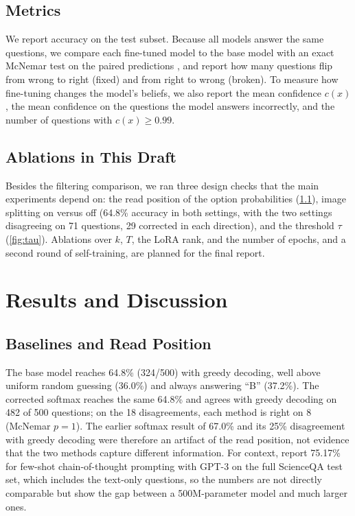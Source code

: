 \documentclass{article}
\begin{document}
\subsection{Metrics}
We report accuracy on the test subset. Because all models answer the same questions, we compare each fine-tuned model to the base model with an exact McNemar test on the paired predictions \citep{dietterich1998tests}, and report how many questions flip from wrong to right (fixed) and from right to wrong (broken). To measure how fine-tuning changes the model's beliefs, we also report the mean confidence $c(x)$, the mean confidence on the questions the model answers incorrectly, and the number of questions with $c(x) \geq 0.99$.

\subsection{Ablations in This Draft}
Besides the filtering comparison, we ran three design checks that the main experiments depend on: the read position of the option probabilities (\cref{sec:read-position-results}), image splitting on versus off (64.8\% accuracy in both settings, with the two settings disagreeing on 71 questions, 29 corrected in each direction), and the threshold $\tau$ (\cref{fig:tau}). Ablations over $k$, $T$, the LoRA rank, and the number of epochs, and a second round of self-training, are planned for the final report.

\section{Results and Discussion}

\subsection{Baselines and Read Position}
\label{sec:read-position-results}
The base model reaches 64.8\% (324/500) with greedy decoding, well above uniform random guessing (36.0\%) and always answering ``B'' (37.2\%). The corrected softmax reaches the same 64.8\% and agrees with greedy decoding on 482 of 500 questions; on the 18 disagreements, each method is right on 8 (McNemar $p = 1$). The earlier softmax result of 67.0\% and its 25\% disagreement with greedy decoding were therefore an artifact of the read position, not evidence that the two methods capture different information. For context, \citet{lu2022scienceqa} report 75.17\% for few-shot chain-of-thought prompting with GPT-3 on the full ScienceQA test set, which includes the text-only questions, so the numbers are not directly comparable but show the gap between a 500M-parameter model and much larger ones.
\end{document}
